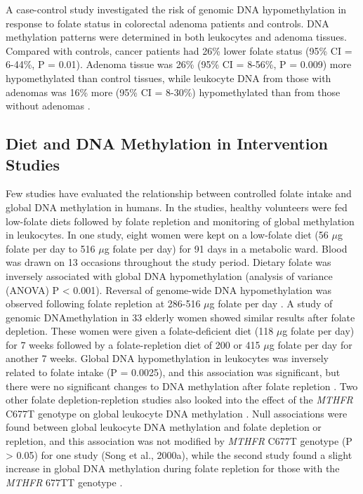 \noindent A case-control study investigated the risk of genomic DNA hypomethylation in response to folate status in colorectal adenoma patients and controls. DNA methylation patterns were determined in both leukocytes and adenoma tissues. Compared with controls, cancer patients had 26\% lower folate status (95\% CI = 6-44\%, P = 0.01). Adenoma tissue was 26\% (95\% CI = 8-56\%, P = 0.009) more hypomethylated than control tissues, while leukocyte DNA from those with adenomas was 16\% more (95\% CI = 8-30\%) hypomethylated than from those without adenomas \cite{c246}. 
 
\subsection{Diet and DNA Methylation in Intervention Studies} %
\noindent Few studies have evaluated the relationship between controlled folate intake and global DNA methylation in humans. In the studies, healthy volunteers were fed low-folate diets followed by folate repletion and monitoring of global methylation in leukocytes. In one study, eight women were kept on a low-folate diet (56 $\mu$g folate per day to 516 $\mu$g folate per day) for 91 days in a metabolic ward. Blood was drawn on 13 occasions throughout the study period. Dietary folate was inversely associated with global DNA hypomethylation (analysis of variance (ANOVA) P < 0.001). Reversal of genome-wide DNA hypomethylation was observed following folate repletion at 286-516 $\mu$g folate per day \cite{c247}. A study of genomic DNAmethylation in 33 elderly women showed similar results after folate depletion. These women were given a folate-deficient diet (118 $\mu$g folate per day) for 7 weeks followed by a folate-repletion diet of 200 or 415 $\mu$g folate per day for another 7 weeks. Global DNA 
hypomethylation in leukocytes was inversely related to folate intake (P = 0.0025), and this association was significant, but there were no significant changes to DNA methylation after folate repletion \cite{c248}. Two other folate depletion-repletion studies also looked into the effect of the \emph{MTHFR} C677T genotype on global leukocyte DNA methylation \cite{c249,c250}. Null associations were found between global leukocyte DNA methylation and folate depletion or repletion, and this association was not modified by \emph{MTHFR} C677T genotype (P > 0.05) for one study (Song et al., 2000a), while the second study found a slight increase in global DNA methylation during folate repletion for those with the \emph{MTHFR} 677TT genotype \cite{c250}. 
 
